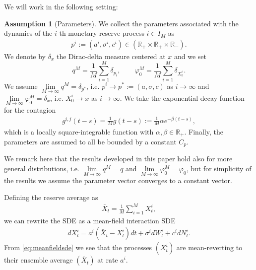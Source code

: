 \documentclass[10pt]{article}
\theoremstyle{plain}
\theoremstyle{definition}
\newtheorem{assumption}[theorem]{Assumption}
\newcommand{\<}{\langle}
\renewcommand{\>}{\rangle}
\renewcommand{\(}{\left(}
\renewcommand{\)}{\right)}
\renewcommand{\[}{\left[}
\renewcommand{\]}{\right]}
\def \phi {{\varphi}}
\begin{document}
We will work in the following setting:
\begin{assumption}[Parameters]\label{ass1}
We collect the parameters associated with the dynamics of the $i$-th monetary reserve process
$i\in I_{M}$ as
\begin{align}
p^i:=(a^i, \sigma^i, c^i)\in (\mathbb{R}_+\times\mathbb{R}_+\times\mathbb{R}_-).
\end{align}
We denote by $\delta_{x}$ the Dirac-delta measure centered at $x$ and we set
$$q^M=\frac{1}{M}\sum\limits_{i=1}^M\delta_{p_i},\qquad
 \phi_0^M=\frac{1}{M}\sum\limits_{i=1}^M\delta_{X_0^i}.$$
We assume $\lim\limits_{M\rightarrow\infty}q^M = \delta_{p^*}$, i.e. $p^i\rightarrow
p^*:=(a,\sigma,c)$ as $i\rightarrow\infty$ and $\lim\limits_{M\rightarrow\infty}\phi_0^M =
\delta_{x}$, i.e. $X_0^i\rightarrow x$ as $i\rightarrow\infty$. We take the exponential decay
function for the contagion
 \begin{align}
g^{i,j}(t-s) = \frac{1}{M}g(t-s):=\frac{1}{M}\alpha e^{-\beta (t-s)},
\end{align}
 which is a locally square-integrable function with $\alpha,\beta\in\mathbb{R}_+$. Finally, the parameters are assumed to all be bounded by a constant $C_p$.
\end{assumption}
We remark here that the results developed in this paper hold also for more general distributions,
i.e. $\lim\limits_{M\rightarrow\infty}q^M=q$ and $\lim\limits_{M\rightarrow\infty}\phi_0^M =
\phi_0$, but for simplicity of the results we assume the parameter vector converges to a constant
vector.

Defining the reserve average as
\begin{align}
\bar X_t = \frac{1}{M}\sum\limits_{i=1}^MX^i_t,
\end{align}
we can rewrite the SDE as a mean-field interaction SDE
\begin{align}\label{eq:meanfieldsde}
dX^i_t = a^i(\bar X_t-X^i_t)dt + \sigma^i dW_t^i + c^idN^i_t.
\end{align}
From \eqref{eq:meanfieldsde} we see that the processes $(X^i_t)$ are mean-reverting to their ensemble average $(\bar X_t)$ at rate $a^i$.
\end{document}
